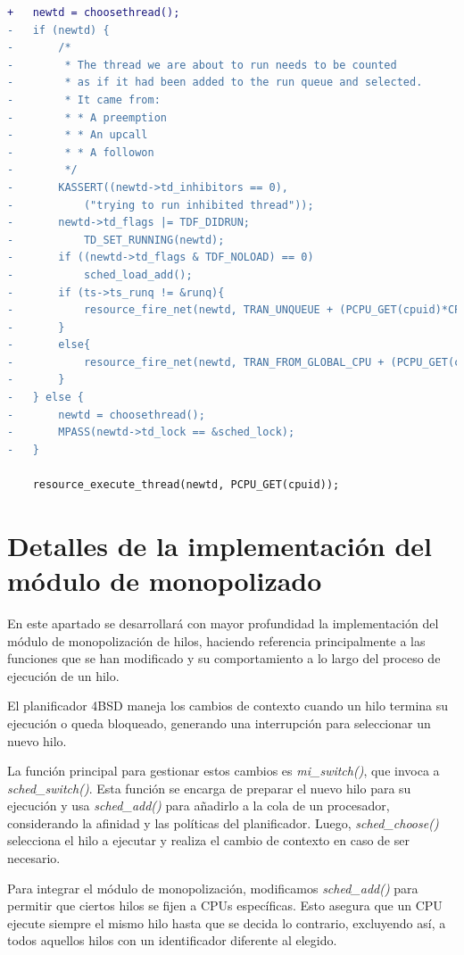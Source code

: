 \begin{lstlisting}[language=diff]
+   newtd = choosethread();
-   if (newtd) {
-       /*
-        * The thread we are about to run needs to be counted
-        * as if it had been added to the run queue and selected.
-        * It came from:
-        * * A preemption
-        * * An upcall
-        * * A followon
-        */
-       KASSERT((newtd->td_inhibitors == 0),
-           ("trying to run inhibited thread"));
-       newtd->td_flags |= TDF_DIDRUN;
-           TD_SET_RUNNING(newtd);
-       if ((newtd->td_flags & TDF_NOLOAD) == 0)
-           sched_load_add();
-       if (ts->ts_runq != &runq){
-           resource_fire_net(newtd, TRAN_UNQUEUE + (PCPU_GET(cpuid)*CPU_BASE_TRANSITIONS));
-       }
-       else{
-           resource_fire_net(newtd, TRAN_FROM_GLOBAL_CPU + (PCPU_GET(cpuid)*CPU_BASE_TRANSITIONS));
-       }
-   } else {
-       newtd = choosethread();
-       MPASS(newtd->td_lock == &sched_lock);
-   }

    resource_execute_thread(newtd, PCPU_GET(cpuid));

\end{lstlisting}

\section{Detalles de la implementación del módulo de monopolizado}\label{appendix:apB}

En este apartado se desarrollará con mayor profundidad la implementación del módulo de monopolización de hilos, haciendo referencia principalmente a las funciones que se han modificado y su comportamiento a lo largo del proceso de ejecución de un hilo.

El planificador 4BSD maneja los cambios de contexto cuando un hilo termina su ejecución o queda bloqueado, generando una interrupción para seleccionar un nuevo hilo.

La función principal para gestionar estos cambios es \textit{mi\_switch()}, que invoca a \textit{sched\_switch()}. Esta función se encarga de preparar el nuevo hilo para su ejecución y usa \textit{sched\_add()} para añadirlo a la cola de un procesador, considerando la afinidad y las políticas del planificador. Luego, \textit{sched\_choose()} selecciona el hilo a ejecutar y realiza el cambio de contexto en caso de ser necesario.

Para integrar el módulo de monopolización, modificamos \textit{sched\_add()} para permitir que ciertos hilos se fijen a CPUs específicas. Esto asegura que un CPU ejecute siempre el mismo hilo hasta que se decida lo contrario, excluyendo así, a todos aquellos hilos con un identificador diferente al elegido.

